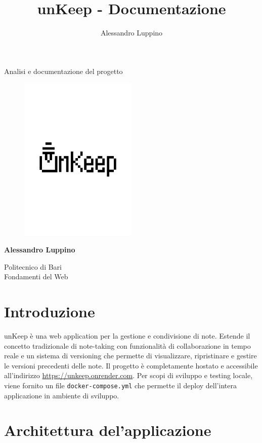 \documentclass[11pt]{article}
\title{unKeep - Documentazione}
\author{Alessandro Luppino}
\begin{document}
\begin{titlepage}
   \begin{center}
       \vspace*{1cm}
       \vspace{0.5cm}
        {\huge Analisi e documentazione del progetto}
       \begin{figure}[H]
    		\centering
            \includegraphics[width=0.5\textwidth]{./Resources/unKeepLogo.png}
            \end{figure}
       \vspace{0.5cm}

       \textbf{Alessandro Luppino}

       \vfill
            
       Politecnico di Bari\\
       Fondamenti del Web
            
       \vspace{0.1cm}
   \end{center}
\end{titlepage}
\tableofcontents
\newpage
\section{Introduzione}
unKeep è una web application per la gestione e condivisione di note. Estende il concetto tradizionale di note-taking con funzionalità di collaborazione in tempo reale e un sistema di versioning che permette di visualizzare, ripristinare e gestire le versioni precedenti delle note.
Il progetto è completamente hostato e accessibile all'indirizzo \url{https://unkeep.onrender.com}. Per scopi di sviluppo e testing locale, viene fornito un file \texttt{docker-compose.yml} che permette il deploy dell'intera applicazione in ambiente di sviluppo.\section{Architettura del'applicazione}
\end{document}
